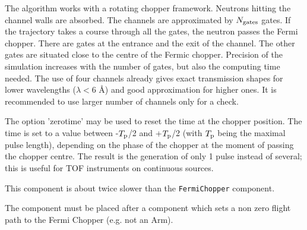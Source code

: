 The algorithm works with a rotating chopper framework. Neutrons hitting the channel
walls are absorbed. The channels are approximated by $N_{\rm gates}$ gates. If the trajectory
takes a course through all the gates, the neutron passes the Fermi chopper. There are gates at
the entrance and the exit of the channel. The other gates are situated close to the centre of
the Fermic chopper.
Precision of the simulation increases with the number of gates, but also the computing time needed.
The use of four channels already gives exact transmission shapes for lower wavelengths
($\lambda < 6$ \AA) and good approximation for higher ones. It is recommended to use larger number of
channels only for a check.

The option 'zerotime' may be used to reset the time at the chopper position. The time is
set to a value between -$T_{\rm p}$/2 and +$T_{\rm p}$/2 (with $T_{\rm p}$ being the maximal pulse length),
depending on the phase of the chopper at the moment of passing the chopper centre. The
result is the generation of only 1 pulse instead of several; this is useful for TOF instruments
on continuous sources.

This component is about twice slower than the \verb+FermiChopper+ component.

The component must be placed after a component which sets a non zero flight path to the Fermi Chopper (e.g. not an Arm).
